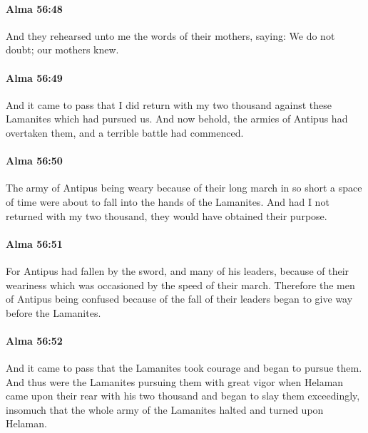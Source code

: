 		\paragraph{Alma 56:48} %
			\label{ALMA-56-48}

			And they rehearsed unto me the words of their mothers, saying:
			We do not doubt; our mothers knew.

		\paragraph{Alma 56:49} %
			\label{ALMA-56-49}

			And it came to pass that I did return with my two thousand
			against these Lamanites which had pursued us.
			And now behold, the armies of Antipus had overtaken them,
			and a terrible battle had commenced.

		\paragraph{Alma 56:50} %
			\label{ALMA-56-50}

			The army of Antipus being weary
			because of their long march in so short a space of time
			were about to fall into the hands of the Lamanites.
			And had I not returned with my two thousand,
			they would have obtained their purpose.

		\paragraph{Alma 56:51} %
			\label{ALMA-56-51}

			For Antipus had fallen by the sword, and many of his leaders,
			because of their weariness which was occasioned by the speed of their march.
			Therefore the men of Antipus
			being confused because of the fall of their leaders
			began to give way before the Lamanites.

		\paragraph{Alma 56:52} %
			\label{ALMA-56-52}

			And it came to pass that the Lamanites took courage and began to pursue them.
			And thus were the Lamanites pursuing them with great vigor
			when Helaman came upon their rear with his two thousand
			and began to slay them exceedingly,
			insomuch that the whole army of the Lamanites halted and turned upon Helaman.

